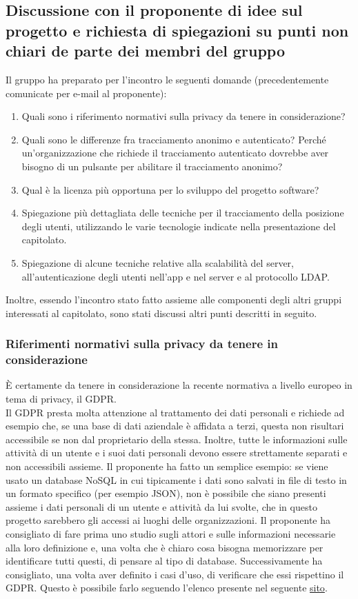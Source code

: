 \subsection{Discussione con il proponente di idee sul progetto \NomeProgetto  e richiesta di spiegazioni su punti non chiari de parte dei membri del gruppo}
Il gruppo ha preparato per l'incontro le seguenti domande (precedentemente comunicate per e-mail al proponente):
\begin{enumerate}
	\item Quali sono i riferimento normativi sulla privacy da tenere in considerazione?
	\item Quali sono le differenze fra tracciamento anonimo e autenticato? Perché un'organizzazione che richiede il tracciamento autenticato dovrebbe aver bisogno di un pulsante per abilitare il tracciamento anonimo?
	\item Qual è la licenza più opportuna per lo sviluppo del progetto software?
	\item Spiegazione più dettagliata delle tecniche per il tracciamento della posizione degli utenti, utilizzando le varie tecnologie indicate nella presentazione del capitolato.
	\item Spiegazione di alcune tecniche relative alla scalabilità del server, all'autenticazione degli utenti nell'app e nel server e al protocollo LDAP.
\end{enumerate}
Inoltre, essendo l'incontro stato fatto assieme alle componenti degli altri gruppi interessati al capitolato, sono stati discussi altri punti descritti in seguito.

\subsubsection*{Riferimenti normativi sulla privacy da tenere in considerazione}
È certamente da tenere in considerazione la recente normativa a livello europeo in tema di privacy, il GDPR. \\
Il GDPR presta molta attenzione al trattamento dei dati personali e richiede ad esempio che, se una base di dati aziendale è affidata a terzi, questa non risultari accessibile se non dal proprietario della stessa.
Inoltre, tutte le informazioni sulle attività di un utente e i suoi dati personali devono essere strettamente separati e non accessibili assieme. Il proponente ha fatto un semplice esempio: se viene usato un database
NoSQL in cui tipicamente i dati sono salvati in file di testo in un formato specifico (per esempio JSON), non è possibile che siano presenti assieme i dati personali di un utente e attività da lui svolte, che in questo progetto
sarebbero gli accessi ai luoghi delle organizzazioni.
Il proponente ha consigliato di fare prima uno studio sugli attori e sulle informazioni necessarie alla loro definizione e, una volta che è chiaro cosa bisogna memorizzare per identificare tutti questi, di pensare al tipo di database.
Successivamente ha consigliato, una volta aver definito i casi d'uso, di verificare che essi rispettino il GDPR. Questo è possibile farlo seguendo l'elenco presente nel seguente \href{https://gdpr.eu/checklist/}{sito}.

